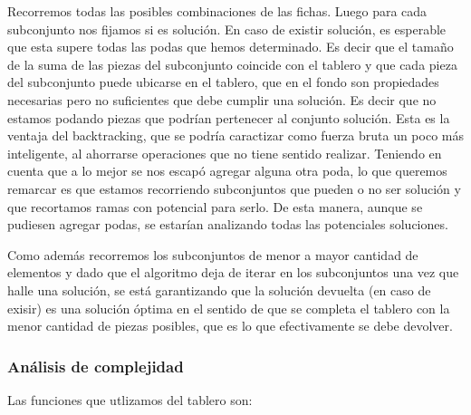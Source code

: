 \quad Recorremos todas las posibles combinaciones de las fichas. Luego para cada subconjunto nos fijamos si es solución. En caso de existir solución, es esperable que esta supere todas las podas que hemos determinado. Es decir que el tamaño de la suma de las piezas del subconjunto coincide con el tablero y que cada pieza del subconjunto puede ubicarse en el tablero, que en el fondo son propiedades necesarias pero no suficientes que debe cumplir una solución. Es decir que no estamos podando piezas que podrían pertenecer al conjunto solución. Esta es la ventaja del backtracking, que se podría caractizar como fuerza bruta un poco más inteligente, al ahorrarse operaciones que no tiene sentido realizar. 
\quad Teniendo en cuenta que a lo mejor se nos escapó agregar alguna otra poda, lo que queremos remarcar es que estamos recorriendo subconjuntos que pueden o no ser solución y que recortamos ramas con potencial para serlo. De esta manera, aunque se pudiesen agregar podas, se estarían analizando todas las potenciales soluciones.

\quad Como además recorremos los subconjuntos de menor a mayor cantidad de elementos y dado que el algoritmo deja de iterar en los subconjuntos una vez que halle una solución, se está garantizando que la solución devuelta (en caso de exisir) es una solución óptima en el sentido de que se completa el tablero con la menor cantidad de piezas posibles, que es lo que efectivamente se debe devolver.
\quad 

\subsubsection{An\'alisis de complejidad}

Las funciones que utlizamos del tablero son:

